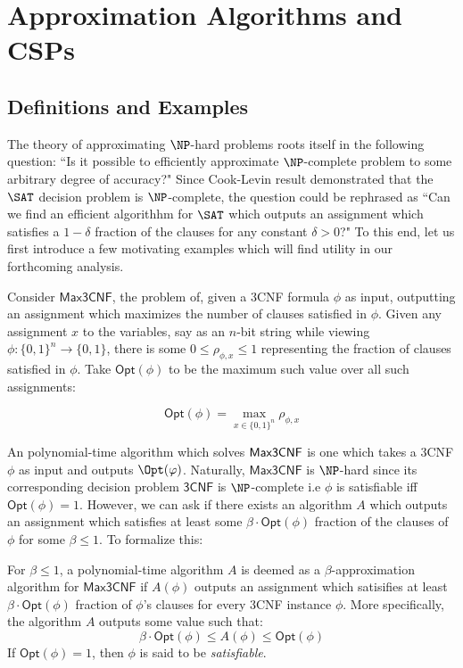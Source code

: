 \section{Approximation Algorithms and CSPs}
\subsection{Definitions and Examples}
The theory of approximating $\NP$-hard problems roots itself in the following question: ``Is it possible to efficiently approximate $\NP$-complete problem to some arbitrary degree of accuracy?" Since Cook-Levin result demonstrated that the $\SAT$ decision problem is $\NP$-complete, the question could be rephrased as ``Can we find an efficient algorithhm for $\SAT$ which outputs an assignment which satisfies a $1-\delta$ fraction of the clauses for any constant $\delta >  0$?" To this end, let us first introduce a few motivating examples which will find utility in our forthcoming analysis. \newline

Consider $\mathsf{Max3CNF}$, the problem of, given a 3CNF formula $\phi$ as input, outputting an assignment which maximizes the number of clauses satisfied in $\phi$. Given any assignment $x$ to the variables, say as an $n$-bit string while viewing $\phi:\{0,1\}^n \rightarrow \{0,1\}$, there is some $0 \leq \rho_{\phi,x} \leq 1$ representing the fraction of clauses satisfied in $\phi$. Take $\mathsf{Opt}(\phi)$ to be the maximum such value over all such assignments:

\[ \mathsf{Opt}(\phi) = \max_{x \in \{0,1\}^n}\rho_{\phi,x} \]

An polynomial-time algorithm which solves $\mathsf{Max3CNF}$ is one which takes a 3CNF $\phi$ as input and outputs $\Opt(\phi)$. Naturally, $\mathsf{Max3CNF}$ is $\NP$-hard since its corresponding decision problem $\mathsf{3CNF}$ is $\NP$-complete i.e $\phi$ is satisfiable iff $\mathsf{Opt}(\phi) = 1$.
%
However, we can ask if there exists an algorithm $A$ which outputs an assignment which satisfies at least some $\beta\cdot\mathsf{Opt}(\phi)$ fraction of the clauses of $\phi$ for some $\beta \leq 1$. To formalize this: \newline
%
\begin{definition} \label{Opt3SATDef}
For $\beta \leq 1$, a polynomial-time algorithm $A$ is deemed as a $\beta$-approximation algorithm for $\mathsf{Max3CNF}$ if $A(\phi)$ outputs an assignment which satisifies at least $\beta\cdot\mathsf{Opt}(\phi)$ fraction of $\phi$'s clauses for every 3CNF instance $\phi$. More specifically, the algorithm $A$ outputs some value such that:
\begin{equation}
  \beta\cdot\mathsf{Opt}(\phi) \leq A(\phi) \leq \mathsf{Opt}(\phi)
\end{equation}
If $\mathsf{Opt}(\phi) = 1$, then $\phi$ is said to be \emph{satisfiable}.
\end{definition}

